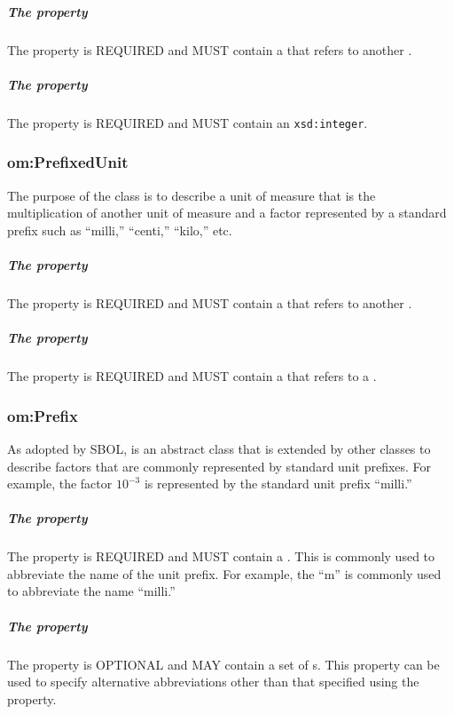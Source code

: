 \subparagraph{The  property}\label{sec:om:hasBase}
The  property is REQUIRED and MUST contain a  that refers to another .

\subparagraph{The  property}\label{sec:om:hasExponent}
The  property is REQUIRED and MUST contain an \texttt{xsd:integer}.

\subsubsection{om:PrefixedUnit}
\label{sec:om:PrefixedUnit}

The purpose of the  class is to describe a unit of measure that is the multiplication of another unit of measure and a factor represented by a standard prefix such as ``milli,'' ``centi,'' ``kilo,'' etc. 

\subparagraph{The  property}\label{sec:om:hasUnit:PrefixedUnit}
The  property is REQUIRED and MUST contain a  that refers to another . 

\subparagraph{The  property}\label{sec:om:hasPrefix}
The  property is REQUIRED and MUST contain a  that refers to a .

\subsubsection{om:Prefix}
\label{sec:om:Prefix}

As adopted by SBOL,  is an abstract class that is extended by other classes to describe factors that are commonly represented by standard unit prefixes. For example, the factor $10^{-3}$ is represented by the standard unit prefix ``milli.'' 

\subparagraph{The  property}\label{sec:om:symbol:Prefix}
The  property is REQUIRED and MUST contain a . This  is commonly used to abbreviate the name of the unit prefix. For example, the  ``m'' is commonly used to abbreviate the name ``milli.''

\subparagraph{The  property}\label{sec:om:alternativeSymbols:Prefix}
The  property is OPTIONAL and MAY contain a set of s. This property can be used to specify alternative abbreviations other than that specified using the  property.

